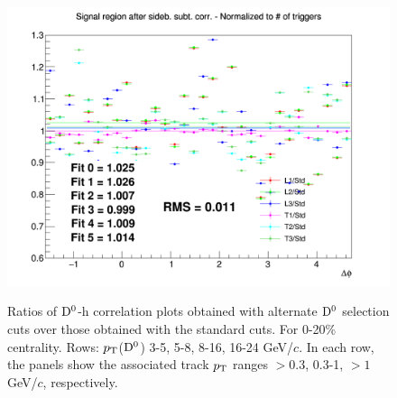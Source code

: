 \begin{figure}
{\includegraphics[width=0.31\linewidth]{figuresVsCent/Dzero/SystDcuts/0_20/Ratio_AzimCorrDistr_Dzero_Canvas_PtIntBins12to12_PoolInt_thr1to99.png}} \\
 \caption{Ratios of ${\rm D^0}$-h correlation plots obtained with alternate ${\rm D^0}$ selection cuts over those obtained with the standard cuts. For 0-20\% centrality. Rows: $p_{\rm T}$(${\rm D^0}$) 3-5, 5-8, 8-16, 16-24 GeV/$c$. In each row, the panels show the associated track
$p_{\rm T}$ ranges $> 0.3$, 0.3-1, $> 1$ GeV/$c$, respectively.}
\label{fig:SysDcut020}
\end{figure}

